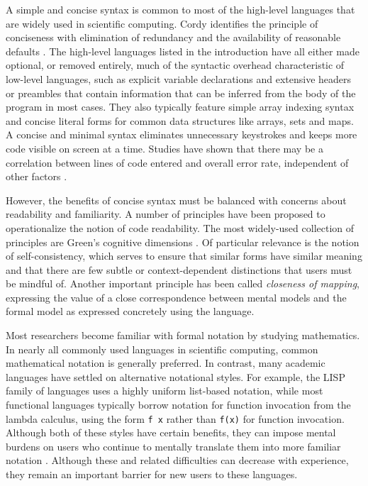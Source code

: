 \documentclass{llncs}
\begin{document}
A simple and concise syntax is common to most of the high-level languages that are widely used in scientific computing. Cordy identifies the principle of conciseness with elimination of redundancy and the availability of reasonable defaults \cite{cordy1992hints}. The high-level languages listed in the introduction have all either made optional, or removed entirely, much of the syntactic overhead characteristic of low-level languages, such as explicit variable declarations and extensive headers or preambles that contain information that can be inferred from the body of the program in most cases. They also typically feature simple array indexing syntax and concise literal forms for common data structures like arrays, sets and maps. A concise and minimal syntax eliminates unnecessary keystrokes and keeps more code visible on screen at a time. Studies have shown that there may be a correlation between lines of code entered and overall error rate, independent of other factors \cite{el2001confounding}. 

However, the benefits of concise syntax must be balanced with concerns about readability and familiarity. A number of principles have been proposed to operationalize the notion of code readability. The most widely-used collection of principles are Green's cognitive dimensions \cite{green1996usability}. Of particular relevance is the notion of self-consistency, which serves to ensure that similar forms have similar meaning and that there are few subtle or context-dependent distinctions that users must be mindful of. Another important principle has been called {\it closeness of mapping}, expressing the value of a close correspondence between mental models and the formal model as expressed concretely using the language.

Most researchers become familiar with formal notation by studying mathematics. In nearly all commonly used languages in scientific computing, common mathematical notation is generally preferred. In contrast, many academic languages have settled on alternative notational styles. For example, the LISP family of languages uses a highly uniform list-based notation, while most functional languages typically borrow notation for function invocation from the lambda calculus, using the form \verb|f x| rather than \verb|f(x)| for function invocation. Although both of these styles have certain benefits, they can impose mental burdens on users who continue to mentally translate them into more familiar notation \cite{anderson1985novice}. Although these and related difficulties can decrease with experience, they remain an important barrier for new users to these languages.
\end{document}
